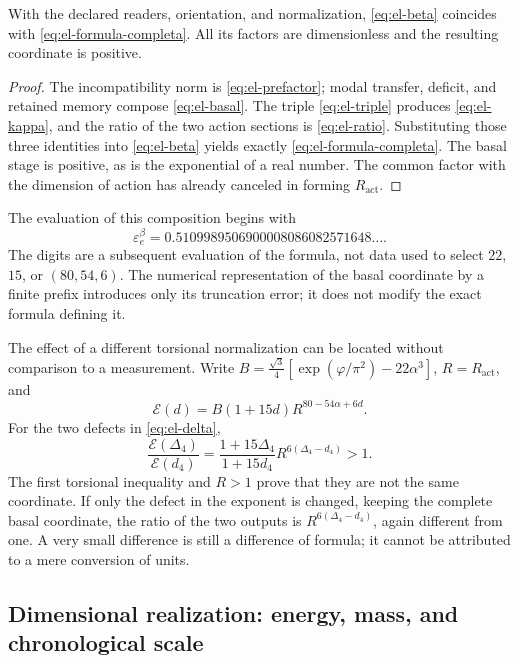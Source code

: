 \begin{theorem}
With the declared readers, orientation, and normalization,
\eqref{eq:el-beta} coincides with \eqref{eq:el-formula-completa}. All
its factors are dimensionless and the resulting coordinate is positive.
\end{theorem}
\begin{proof}
The incompatibility norm is \eqref{eq:el-prefactor}; modal transfer,
deficit, and retained memory compose \eqref{eq:el-basal}. The
triple \eqref{eq:el-triple} produces \eqref{eq:el-kappa}, and the ratio of
the two action sections is \eqref{eq:el-ratio}. Substituting those
three identities into \eqref{eq:el-beta} yields exactly
\eqref{eq:el-formula-completa}. The basal stage is positive, as is the
exponential of a real number. The common factor with the dimension of
action has already canceled in forming \(R_{\mathrm{act}}\).
\end{proof}

The evaluation of this composition begins with
\begin{equation}
 \varepsilon_e^\beta
 =0.5109989506900008086082571648\ldots.
 \label{eq:el-beta-decimal}
\end{equation}
The digits are a subsequent evaluation of the formula, not data used
to select \(22\), \(15\), or \((80,54,6)\). The numerical
representation of the basal coordinate by a finite prefix introduces only its
truncation error; it does not modify the exact formula defining it.

The effect of a different torsional normalization can be located
without comparison to a measurement. Write
\(B=\frac{\sqrt3}{4}[\exp(\varphi/\pi^2)-22\alpha^3]\),
\(R=R_{\mathrm{act}}\), and
\[
 \mathcal E(d)=B(1+15d)R^{80-54\alpha+6d}.
\]
For the two defects in \eqref{eq:el-delta},
\begin{equation}
 \frac{\mathcal E(\Delta_4)}{\mathcal E(d_4)}
 =\frac{1+15\Delta_4}{1+15d_4}
   R^{6(\Delta_4-d_4)}>1.
 \label{eq:el-normalizacion-beta}
\end{equation}
The first torsional inequality and \(R>1\) prove that they are not the same
coordinate. If only the defect in the exponent is changed, keeping the
complete basal coordinate, the ratio of the two outputs is
\(R^{6(\Delta_4-d_4)}\), again different from one. A very small
difference is still a difference of formula; it cannot be attributed to
a mere conversion of units.

\subsection{Dimensional realization: energy, mass, and chronological scale}

